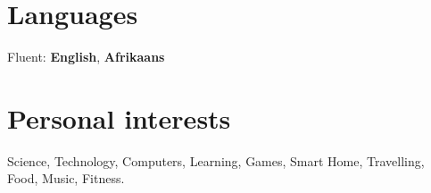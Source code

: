\documentclass[a4paper,online,extended]{adcv}
\begin{document}

\section{Languages}

\ifextended

  \begin{adcvtablethree}
  \end{adcvtablethree}
  
\else
  Fluent: \textbf{English}, \textbf{Afrikaans}
\fi

  \section{Personal interests}

  Science, Technology, Computers, Learning, Games, Smart Home, Travelling, Food, Music, Fitness.
\end{document}
